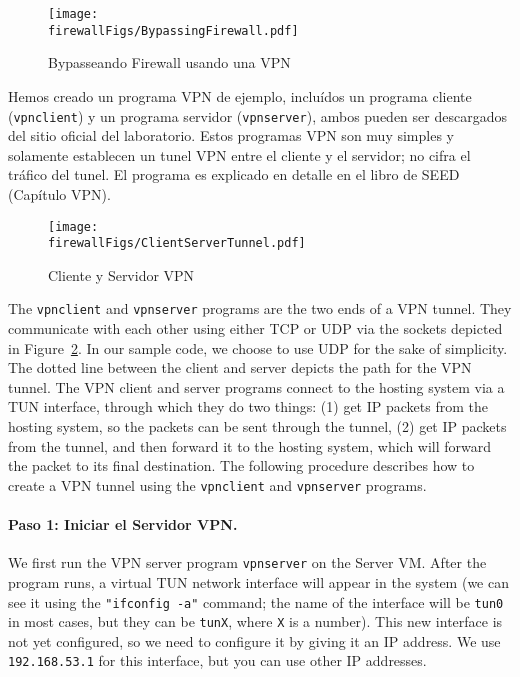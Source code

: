 \begin{figure}[htb]
\begin{center}
\texttt{[image: \\firewallFigs/BypassingFirewall.pdf]}
\end{center}
\caption{Bypasseando Firewall usando una VPN}
\label{vpn_firewall:fig:bypassing}
\end{figure}
 
Hemos creado un programa VPN de ejemplo, incluídos un programa cliente (\texttt{vpnclient}) y un programa servidor (\texttt{vpnserver}), ambos pueden ser descargados del sitio oficial del laboratorio. Estos programas VPN son muy simples y solamente establecen un tunel VPN entre el cliente y el servidor; no cifra el tráfico del tunel.
El programa es explicado en detalle en el libro de SEED (Capítulo VPN).


\begin{figure}[htb]
\begin{center}
\texttt{[image: \\firewallFigs/ClientServerTunnel.pdf]}
\end{center}
\caption{Cliente y Servidor VPN}
\label{vpn_firewall:fig:client_server}
\end{figure}

The \texttt{vpnclient} and \texttt{vpnserver} programs are the two ends of
a VPN tunnel. They communicate with each other using either TCP or UDP via the sockets
depicted in Figure~\ref{vpn_firewall:fig:client_server}. In our sample code, we choose
to use UDP for the sake of simplicity.  The dotted line between the
client and server depicts the path for the VPN tunnel.
The VPN client and server programs connect to the hosting system via a
TUN interface, through which they do two things: (1) get IP packets from
the hosting system, so the packets can be sent through the tunnel, (2) get IP packets from the
tunnel, and then forward it to the hosting system, which will forward the
packet to its final destination.
The following procedure describes how to create a VPN tunnel
using the \texttt{vpnclient} and \texttt{vpnserver} programs.


\paragraph{Paso 1: Iniciar el Servidor VPN.}
We first run the VPN server program \texttt{vpnserver} on the Server VM.
After the program runs, a virtual TUN network interface will appear
in the system (we can see it using the \texttt{"ifconfig -a"} command; the name of the
interface will be \texttt{tun0} in most cases, but they can be
\texttt{tunX}, where \texttt{X} is a number).
This new interface is not yet configured, so we need to configure it by giving it an IP
address. We use \texttt{192.168.53.1} for this interface, but you can use 
other IP addresses. 


